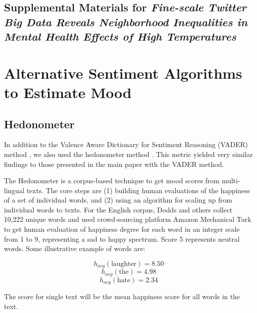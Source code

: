 \documentclass{article}
\begin{document}
\begin{center}
\section*{Supplemental Materials for \textit{Fine-scale Twitter Big Data Reveals Neighborhood Inequalities in Mental Health Effects of High Temperatures}}
\end{center}

\setcounter{table}{0}
\setcounter{figure}{0}
\setcounter{section}{0}
\renewcommand{\thetable}{S\arabic{table}}
\renewcommand{\thefigure}{S\arabic{figure}}
\renewcommand{\thesection}{S\arabic{section}}

\section{Alternative Sentiment Algorithms to Estimate Mood}

\subsection{Hedonometer}

In addition to the Valence Aware Dictionary for Sentiment Reasoning (VADER) method \cite{gilbert_vader_2014}, we also used the hedonometer method \cite{Dodds2011Dec}.  This metric yielded very similar findings to those presented in the main paper with the VADER method.

The Hedonometer \cite{dodds_temporal_2011} is a corpus-based technique to get mood scores from multi-lingual texts. The core steps are (1) building human evaluations of the happiness of a set of individual words, and (2) using an algorithm for scaling up from individual words to texts. For the English corpus, Dodds and others \cite{dodds_temporal_2011} collect 10,222 unique words and used crowd-sourcing platform Amazon Mechanical Turk to get human evaluation of happiness degree for each word in an integer scale from 1 to 9, representing a sad to happy spectrum. Score 5 represents neutral words. Some illustrative example of words are: 

\[h_{avg} (\text{laughter}) = 8.50 \]
\[h_{avg} (\text{the}) = 4.98\]
\[h_{avg} (\text{hate}) = 2.34\]

The score for single text will be the mean happiness score for all words in the text.
\end{document}
